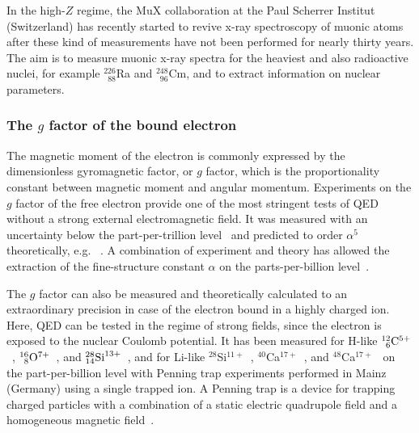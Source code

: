 In the high-$Z$ regime, the MuX collaboration at the Paul Scherrer Institut (Switzerland) has recently started to revive x-ray spectroscopy of muonic atoms after these kind of measurements have not been performed for nearly thirty years.
The aim is to measure muonic x-ray spectra for the heaviest and also radioactive nuclei, for example $^{226}_{\phantom{1}88}$Ra and $^{248}_{\phantom{1}96}$Cm, and to extract information on nuclear parameters. 

\subsubsection*{The $g$ factor of the bound electron}
The magnetic moment of the electron is commonly expressed by the dimensionless gyromagnetic factor, or $g$ factor, which is the proportionality constant between magnetic moment and angular momentum. Experiments on the $g$ factor of the free electron provide one of the most stringent tests of QED without a strong external electromagnetic field. It was measured with an uncertainty below the part-per-trillion level~\cite{odom2006,hanneke2008} and predicted to order $\alpha^5$ theoretically, e.g.~  \cite{schwinger1948,Peterman57,Sommerfield1957,Sommerfield58,Laporta96,kinoshita2006,aoyama2007,aoyama2015,aoyama2017}. A combination of experiment and theory has allowed the extraction of the fine-structure constant $\alpha$ on the parts-per-billion level~\cite{gabrielse2006,gabrielse2007}.

The $g$ factor can also be measured and theoretically calculated to an extraordinary precision in case of the electron bound in a highly charged ion. Here, QED can be tested in the regime of strong fields, since the electron is exposed to the nuclear Coulomb potential. It has been measured for H-like $^{12}_{\phantom{0}6}\rm{C}^{5+}$~\cite{Haffner2000,Sturm2014}, $^{16}_{\phantom{0}8}\rm{O}^{7+}$~\cite{Verdu2004}, and $^{28}_{14}\rm{Si}^{13+}$~\cite{Sturm2011}, and for Li-like $^{28}$Si$^{11+}$~\cite{sturm2013}, $^{40}$Ca$^{17+}$~\cite{Kohler2016}, and $^{48}$Ca$^{17+}$~\cite{Kohler2016} on the part-per-billion level with Penning trap experiments performed in Mainz (Germany) using a single trapped ion. A Penning trap is a device for trapping charged particles with a combination of a static electric quadrupole field and a homogeneous magnetic field~\cite{annphysgfactor,geoniumtheory}. 

